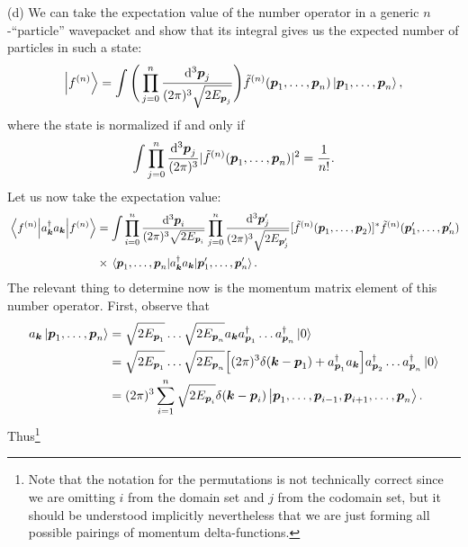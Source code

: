 {(d) We can take the expectation value of the number operator in a generic $n$-``particle'' wavepacket and show that its integral gives us the expected number of particles in such a state:
\begin{align}
    \ket{f^{(n)}} = \int \Bigg( \prod_{j=0}^{n} \frac{\dd[3]{\vb*{p}_{j}}}{(2 \pi)^3 \sqrt{2 E_{\vb*{p}_{j}}}} \Bigg) \tilde{f}^{(n)}(\vb*{p}_{1},\ldots,\vb*{p}_{n}) \ket{\vb*{p}_{1},\ldots,\vb*{p}_{n}}
,\end{align}
where the state is normalized if and only if
\begin{align}
    \int \prod_{j=0}^{n} \frac{\dd[3]{\vb*{p}_{j}}}{(2 \pi)^3} | \tilde{f}^{(n)}(\vb*{p}_{1},\ldots,\vb*{p}_{n}) |^2 = \frac{1}{n!}
.\end{align}
Let us now take the expectation value:
\begin{align}
    \mel{f^{(n)}}{a_{\vb*{k}}^{\dagger} a_{\vb*{k}}}{f^{(n)}} &= \int \prod_{i=0}^{n} \frac{\dd[3]{\vb*{p}_{i}}}{(2 \pi)^3 \sqrt{2 E_{\vb*{p}_{i}}}} \prod_{j=0}^{n} \frac{\dd[3]{\vb*{p}_{j}'}}{(2 \pi)^3 \sqrt{2 E_{\vb*{p}_{j}'}}} [\tilde{f}^{(n)}(\vb*{p}_{1},\ldots,\vb*{p}_{2})]^{*} \tilde{f}^{(n)}(\vb*{p}_{1}',\ldots,\vb*{p}_{n}') \nonumber \\
                                                              &\times \mel{\vb*{p}_{1},\ldots,\vb*{p}_{n}}{a_{\vb*{k}}^{\dagger} a_{\vb*{k}}}{\vb*{p}_{1}',\ldots,\vb*{p}_{n}'}
.\end{align}
The relevant thing to determine now is the momentum matrix element of this number operator.
First, observe that
\begin{align}
    a_{\vb*{k}} \ket{\vb*{p}_{1},\ldots,\vb*{p}_{n}} &= \sqrt{2 E_{\vb*{p}_{1}}} \ldots \sqrt{2 E_{\vb*{p}_{n}}} a_{\vb*{k}} a_{\vb*{p}_{1}}^{\dagger} \ldots a_{\vb*{p}_{n}}^{\dagger} \ket{0} \nonumber \\
    &= \sqrt{2 E_{\vb*{p}_{1}}} \ldots \sqrt{2 E_{\vb*{p}_{n}}} \Big[ (2 \pi)^3 \delta(\vb*{k} - \vb*{p}_{1}) + a_{\vb*{p}_{1}}^{\dagger} a_{\vb*{k}} \Big] a_{\vb*{p}_{2}}^{\dagger} \ldots a_{\vb*{p}_{n}}^{\dagger} \ket{0} \nonumber \\
    &= (2 \pi)^3 \sum_{i=1}^{n} \sqrt{2 E_{\vb*{p}_{i}}} \delta(\vb*{k} - \vb*{p}_{i}) \ket{\vb*{p}_{1},\ldots,\vb*{p}_{i-1},\vb*{p}_{i+1},\ldots,\vb*{p}_{n}}
.\end{align}
Thus\footnote{
Note that the notation for the permutations is not technically correct since we are omitting $i$ from the domain set and $j$ from the codomain set, but it should be understood implicitly nevertheless that we are just forming all possible pairings of momentum delta-functions.
}}
